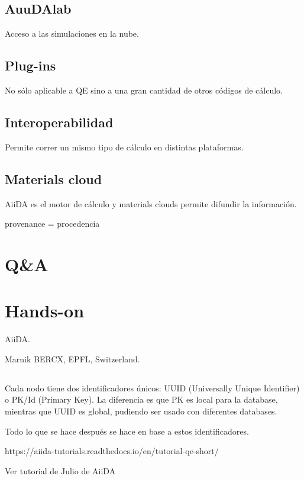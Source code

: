 \subsection{AuuDAlab}

  Acceso a las simulaciones en la nube.

\subsection{Plug-ins}

  No sólo aplicable a QE sino a una gran cantidad de otros códigos de cálculo.

\subsection{Interoperabilidad}

  Permite correr un mismo tipo de cálculo en distintas plataformas.

\subsection{Materials cloud}

  AiiDA es el motor de cálculo y materials clouds permite difundir la información.


  provenance = procedencia

\section{Q\&A}

\section{Hands-on}

   AiiDA.

  	Marnik BERCX, EPFL, Switzerland.

\subsection{}

  Cada nodo tiene dos identificadores únicos: UUID (Universally Unique Identifier) o PK/Id (Primary Key). La diferencia es que PK es local para la database, mientras que UUID es global, pudiendo ser usado con diferentes databases.

  Todo lo que se hace después se hace en base a estos identificadores.

  https://aiida-tutorials.readthedocs.io/en/tutorial-qe-short/

  Ver tutorial de Julio de AiiDA
